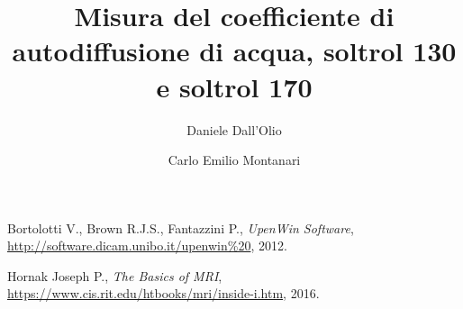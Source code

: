\documentclass[10pt,a4paper,twocolumn]{article}
\title{Misura del coefficiente di autodiffusione di acqua, soltrol 130 e soltrol 170}
\author{Daniele Dall'Olio \and Carlo Emilio Montanari}
\begin{document}








\begin{thebibliography}{9}

  Bortolotti V., Brown R.J.S., Fantazzini P.,
  \textit{UpenWin Software},
  \url{http://software.dicam.unibo.it/upenwin%20},
  2012.

 Hornak Joseph P.,
 \textit{The Basics of MRI},
 \url{https://www.cis.rit.edu/htbooks/mri/inside-i.htm},
 2016.

\end{thebibliography}
\end{document}
